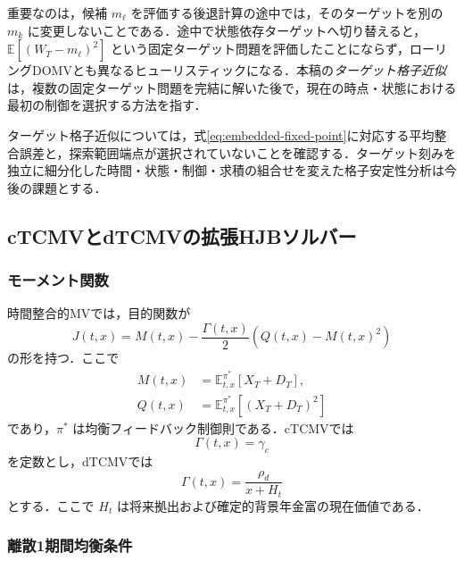 \documentclass[10pt,a4paper]{article}
\theoremstyle{plain}
\theoremstyle{definition}
\newcommand{\E}{\mathbb{E}}
\begin{document}
重要なのは，候補 $m_\ell$ を評価する後退計算の途中では，そのターゲットを別の $m_k$ に変更しないことである．途中で状態依存ターゲットへ切り替えると，$\E[(W_T-m_\ell)^2]$ という固定ターゲット問題を評価したことにならず，ローリングDOMVとも異なるヒューリスティックになる．本稿の\emph{ターゲット格子近似}は，複数の固定ターゲット問題を完結に解いた後で，現在の時点・状態における最初の制御を選択する方法を指す．

ターゲット格子近似については，式\eqref{eq:embedded-fixed-point}に対応する平均整合誤差と，探索範囲端点が選択されていないことを確認する．ターゲット刻みを独立に細分化した時間・状態・制御・求積の組合せを変えた格子安定性分析は今後の課題とする．

\subsection{cTCMVとdTCMVの拡張HJBソルバー}
\label{sec:extended}

\subsubsection{モーメント関数}

時間整合的MVでは，目的関数が
\begin{equation}
  J(t,x)=M(t,x)-\frac{\Gamma(t,x)}{2}
  \left(Q(t,x)-M(t,x)^2\right)
  \label{eq:tc-objective}
\end{equation}
の形を持つ．ここで
\begin{align}
  M(t,x)&=\E_{t,x}^{\pi^*}[X_T+D_T],\label{eq:M-def}\\
  Q(t,x)&=\E_{t,x}^{\pi^*}[(X_T+D_T)^2]\label{eq:Q-def}
\end{align}
であり，$\pi^*$ は均衡フィードバック制御則である．cTCMVでは
\begin{equation}
  \Gamma(t,x)=\gamma_c
  \label{eq:gamma-c}
\end{equation}
を定数とし，dTCMVでは
\begin{equation}
  \Gamma(t,x)=\frac{\rho_d}{x+H_t}
  \label{eq:gamma-d}
\end{equation}
とする．ここで $H_t$ は将来拠出および確定的背景年金富の現在価値である．

\subsubsection{離散1期間均衡条件}
\end{document}
